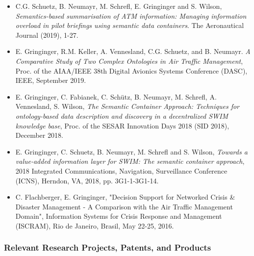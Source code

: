 \documentclass[a4paper,11pt]{article}
\begin{document}
\begin{itemize}
\item C.G. Schuetz, B. Neumayr, M. Schrefl, E. Gringinger and S. Wilson, \emph{Semantics-based summarisation of ATM information: Managing information overload in pilot briefings using semantic data containers}. The Aeronautical Journal (2019), 1-27. %
\item E. Gringinger, R.M. Keller, A. Vennesland, C.G. Schuetz, and B. Neumayr. \emph{A Comparative Study of Two Complex Ontologies in Air Traffic Management}, Proc. of the AIAA/IEEE 38th Digital Avionics Systems Conference (DASC), IEEE, September 2019. %
\item E. Gringinger, C. Fabianek, C. Schütz, B. Neumayr, M. Schrefl, A. Vennesland, S. Wilson, \emph{The Semantic Container Approach: Techniques for ontology-based data description and discovery in a decentralized SWIM knowledge base}, Proc. of the SESAR Innovation Days 2018 (SID 2018), December 2018. %
\item E. Gringinger, C. Schuetz, B. Neumayr, M. Schrefl and S. Wilson, \emph{Towards a value-added information layer for SWIM: The semantic container approach}, 2018 Integrated Communications, Navigation, Surveillance Conference (ICNS), Herndon, VA, 2018, pp. 3G1-1-3G1-14. 
\item C. Flachberger, E. Gringinger, "Decision Support for Networked Crisis \& Disaster Management - A Comparison with the Air Traffic Management Domain", Information Systems for Crisis Response and Management (ISCRAM), Rio de Janeiro, Brasil, May 22-25, 2016. %
\end{itemize}


\subsubsection*{Relevant Research Projects, Patents, and Products}
\end{document}
